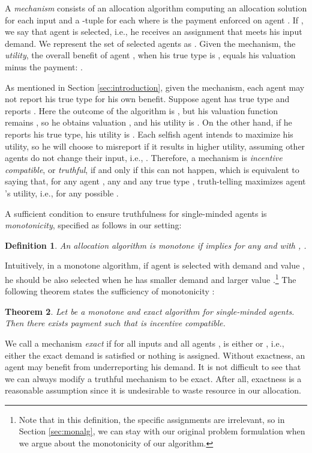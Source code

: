 \documentclass{aamas2013}
\newtheorem{theorem}{Theorem}[section]
\newtheorem{definition}[theorem]{Definition}
\begin{document}
A {\em mechanism}  consists of an allocation algorithm  computing an allocation solution  for each input  and a -tuple  for each  where  is the payment enforced on agent .  If , we say that agent  is selected, i.e., he receives an assignment that meets his input demand.  We represent the set of selected agents as . 
Given the mechanism, the {\em utility}, the overall benefit of agent , when his true type is , equals his valuation minus the payment: .

As mentioned in Section \ref{sec:introduction}, given the mechanism, each agent may not report his true type for his own benefit.  Suppose agent  has true type  and reports .  Here the outcome of the algorithm  is , but his valuation function remains , so he obtains valuation , and his utility is .  On the other hand, if he reports his true type, his utility is .  Each selfish agent intends to maximize his utility, so he will choose to misreport  if it results in higher utility, assuming other agents do not change their input, i.e., .  Therefore, a mechanism is {\em incentive compatible}, or {\em truthful}, if and only if this can not happen, which is equivalent to saying that, for any agent , any  and any true type , truth-telling maximizes agent 's utility, i.e.,  for any possible .    

A sufficient condition to ensure truthfulness for single-minded agents is {\em monotonicity}, specified as follows in our setting:

\begin{definition}\label{def:mon}
An allocation algorithm  is {\em monotone} if  implies  for any  and  with , . 
\end{definition}
Intuitively, in a monotone algorithm, if agent  is selected with demand  and value , he should be also selected when he has smaller demand  and larger value .\footnote{Note that in this definition, the specific assignments  are irrelevant, so in Section \ref{sec:monalg}, we can stay with our original problem formulation when we argue about the monotonicity of our algorithm.}  
The following theorem states the sufficiency of monotonicity \cite{BKV05KS,LOS99mono}:
\begin{theorem}
\label{thm:IC}
Let  be a monotone and exact algorithm for single-minded agents.  Then there exists payment  such that  is incentive compatible.
\end{theorem}

We call a mechanism {\em exact} if for all inputs  and all agents ,  is either  or , i.e., either the exact demand is satisfied or nothing is assigned.  Without exactness, an agent may benefit from underreporting his demand.  It is not difficult to see that we can always modify a truthful mechanism to be exact.  After all, exactness is a reasonable assumption since it is undesirable to waste resource in our allocation.     
\end{document}
